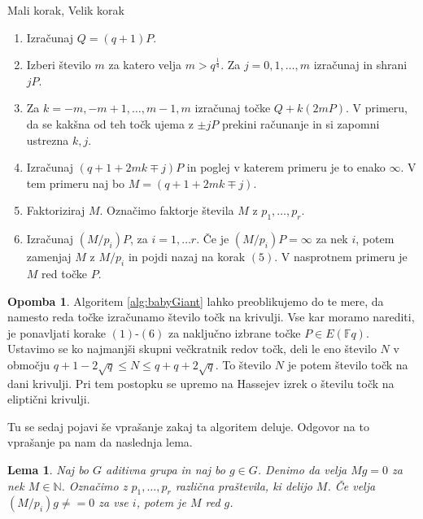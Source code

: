 \documentclass[12pt,a4paper,twoside]{article}
\theoremstyle{definition} %
\newtheorem{opomba}[definicija]{Opomba}
\theoremstyle{plain} %
\newtheorem{lema}[definicija]{Lema}
\numberwithin{equation}{section}  %
\newcommand{\N}{\mathbb N}
\newcommand{\F}{\mathbb F}
\begin{document}
\begin{algorithm}[H]
\caption[MV]{Mali korak, Velik korak}
\label{alg:babyGiant}
\begin{enumerate}
\item Izračunaj $Q = (q+1)P$.
\item Izberi število $m$ za katero velja $m >q^{\frac{1}{4}}$. Za $j = 0,1,\ldots,m$ izračunaj in shrani $jP$.
\item Za $k = -m,-m+1,\ldots,m-1,m$ izračunaj točke $Q +k(2mP)$. V primeru, da se kakšna od teh točk ujema z $\pm jP$ prekini računanje in si zapomni ustrezna $k,j$.
\item Izračunaj $(q+1+2mk \mp j)P$ in poglej v katerem primeru je to enako $\infty$. V tem primeru naj bo $M = (q+1+2mk \mp j)$.
\item Faktoriziraj $M$. Označimo faktorje števila $M$ z $p_1,\ldots,p_r$.
\item Izračunaj $(M/p_i)P$, za $i=1,\ldots r$. Če je $(M/p_i)P = \infty$ za nek $i$, potem zamenjaj $M$ z $M/p_i$ in pojdi nazaj na korak $(5)$. V nasprotnem primeru je $M$ red točke $P$.
\end{enumerate}

\end{algorithm}

\begin{opomba}

Algoritem \ref{alg:babyGiant} lahko preoblikujemo do te mere, da namesto reda točke izračunamo število točk na krivulji. Vse kar moramo narediti, je ponavljati korake $(1)$-$(6)$ za naključno izbrane točke $P \in E(\F{q})$. Ustavimo se ko najmanjši skupni večkratnik redov točk, deli le eno število $N$ v območju $q+1-2\sqrt{q} \leq N \leq q+q+2\sqrt{q}$. To število $N$ je potem število točk na dani krivulji. Pri tem postopku se upremo na Hassejev izrek o številu točk na eliptični krivulji.

\end{opomba}

Tu se sedaj pojavi še vprašanje zakaj ta algoritem deluje. Odgovor na to vprašanje pa nam da naslednja lema.

\begin{lema}

Naj bo $G$ aditivna grupa in naj bo $g\in G$. Denimo da velja $Mg = 0$ za nek $M \in \N$. Označimo z $p_1,\ldots,p_r$ različna praštevila, ki delijo $M$. Če velja $(M/p_i)g \neq = 0$ za vse $i$, potem je $M$ red $g$.

\end{lema}
\end{document}

